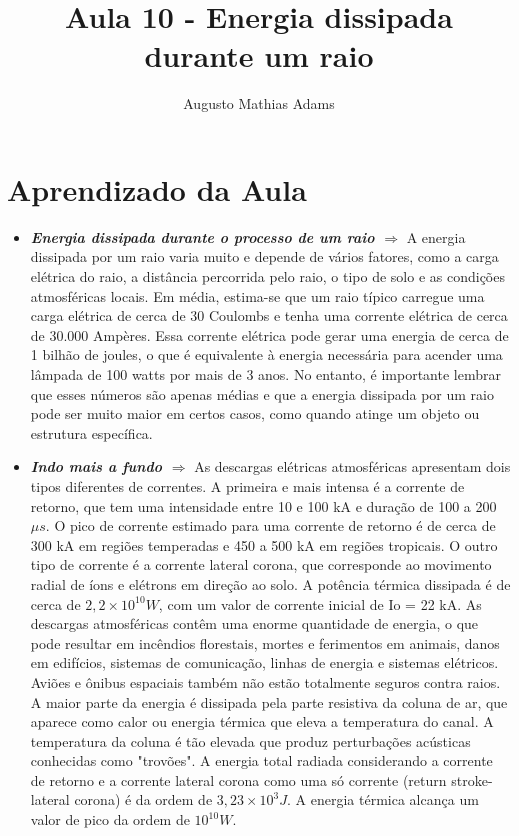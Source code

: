 \documentclass[a4paper, 12pt, onecolumn,singlespacing]{article}
\title{Aula 10 - Energia dissipada durante um raio}
\author[1]{Augusto Mathias Adams}
\affil[1]{augusto.adams@ufpr.br}
\begin{document}
	
	\maketitle
	
	\section{Aprendizado da Aula}
	
	\begin{itemize}
		\item \textbf{\textit{Energia dissipada durante o processo de um raio $\Rightarrow$ }} A energia dissipada por um raio varia muito e depende de vários fatores, como a carga elétrica do raio, a distância percorrida pelo raio, o tipo de solo e as condições atmosféricas locais. Em média, estima-se que um raio típico carregue uma carga elétrica de cerca de 30 Coulombs e tenha uma corrente elétrica de cerca de 30.000 Ampères. Essa corrente elétrica pode gerar uma energia de cerca de 1 bilhão de joules, o que é equivalente à energia necessária para acender uma lâmpada de 100 watts por mais de 3 anos. No entanto, é importante lembrar que esses números são apenas médias e que a energia dissipada por um raio pode ser muito maior em certos casos, como quando atinge um objeto ou estrutura específica.
		
		\item \textbf{\textit{Indo mais a fundo $\Rightarrow$ }}As descargas elétricas atmosféricas apresentam dois tipos diferentes de correntes. A primeira e mais intensa é a corrente de retorno, que tem uma intensidade entre 10 e 100 kA e duração de 100 a 200 $\mu s$. O pico de corrente estimado para uma corrente de retorno é de cerca de 300 kA em regiões temperadas e 450 a 500 kA em regiões tropicais. O outro tipo de corrente é a corrente lateral corona, que corresponde ao movimento radial de íons e elétrons em direção ao solo. A potência térmica dissipada é de cerca de $2,2 × 10^10 W$, com um valor de corrente inicial de Io = 22 kA. As descargas atmosféricas contêm uma enorme quantidade de energia, o que pode resultar em incêndios florestais, mortes e ferimentos em animais, danos em edifícios, sistemas de comunicação, linhas de energia e sistemas elétricos. Aviões e ônibus espaciais também não estão totalmente seguros contra raios. A maior parte da energia é dissipada pela parte resistiva da coluna de ar, que aparece como calor ou energia térmica que eleva a temperatura do canal. A temperatura da coluna é tão elevada que produz perturbações acústicas conhecidas como "trovões". A energia total radiada considerando a corrente de retorno e a corrente lateral corona como uma só corrente (return stroke-lateral corona) é da ordem de $3,23 × 10^3 J$. A energia térmica alcança um valor de pico da ordem de $10^{10} W$.
	\end{itemize}
	
\end{document}
